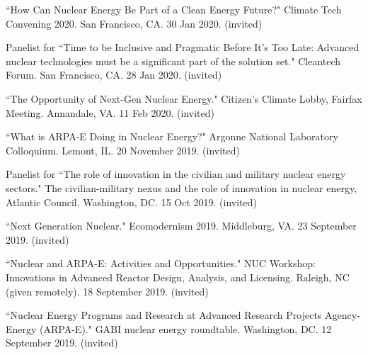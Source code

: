 \begin{bibsection}

\item ``How Can Nuclear Energy Be Part of a Clean Energy Future?" Climate Tech Convening 2020. San Francisco, CA. 30 Jan 2020.
(invited)

\item Panelist for ``Time to be Inclusive and Pragmatic Before It’s Too Late: Advanced nuclear technologies must be a significant part of the solution set." Cleantech Forum. San Francisco, CA. 28 Jan 2020.
(invited)

\item ``The Opportunity of Next-Gen Nuclear Energy." Citizen's Climate Lobby, Fairfax Meeting. Annandale, VA. 11 Feb 2020. (invited)

\item ``What is ARPA-E Doing in Nuclear Energy?" Argonne National
Laboratory Colloquium. Lemont, IL. 20 November 2019. (invited)


\item Panelist for ``The role of innovation in the civilian and
military nuclear energy sectors." The civilian-military nexus and the role of
innovation in nuclear energy, Atlantic Council. Washington, DC. 15 Oct 2019.
(invited)

\item ``Next Generation Nuclear." Ecomodernism 2019.
Middleburg, VA. 23 September 2019. (invited)

\item ``Nuclear and ARPA-E: Activities and Opportunities." NUC
Workshop: Innovations in Advanced Reactor Design, Analysis, and Licensing.
Raleigh, NC (given remotely). 18 September 2019. (invited)

\item ``Nuclear Energy Programs and Research at Advanced
Research Projects Agency-Energy (ARPA-E)." GABI nuclear energy roundtable.
Washington, DC. 12 September 2019. (invited)



\end{bibsection}
